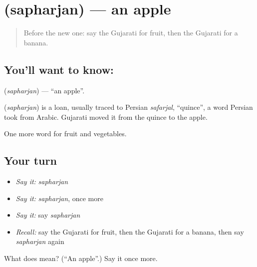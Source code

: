 \section[\texorpdfstring{\gu{સફરજન} (sapharjan)}{સફરજન (sapharjan)}]{ (sapharjan) — an apple}

\label{lesson:GU-C59-apple}



\begin{quote}
Before the new one: say the Gujarati for fruit, then the Gujarati for a banana.
\end{quote}

\subsection*{You'll want to know: }
\textbf{} (\emph{sapharjan}) — \textquotedblleft{}an apple\textquotedblright{}.

\begin{cousinweb}
\textbf{} (\emph{sapharjan}) is a loan, usually traced to Persian \emph{safarjal}, \textquotedblleft{}quince\textquotedblright{}, a word Persian took from Arabic. Gujarati moved it from the quince to the apple.
\end{cousinweb}

\begin{grammarlens}[title={What you've built}]
One more word for fruit and vegetables.
\end{grammarlens}

\subsection*{Your turn}
\begin{itemize}
\raggedright
  \item \emph{Say it:} \emph{sapharjan}
  \item \emph{Say it:} \emph{sapharjan}, once more
  \item \emph{Say it:} say \emph{sapharjan}
  \item \emph{Recall:} say the Gujarati for fruit, then the Gujarati for a banana, then say \emph{sapharjan} again
\end{itemize}

\begin{tcolorbox}[breakable,colback=teal!4,colframe=teal!35!black,title={Before you move on}]
What does  mean? (\textquotedblleft{}An apple\textquotedblright{}.) Say it once more.
\end{tcolorbox}
